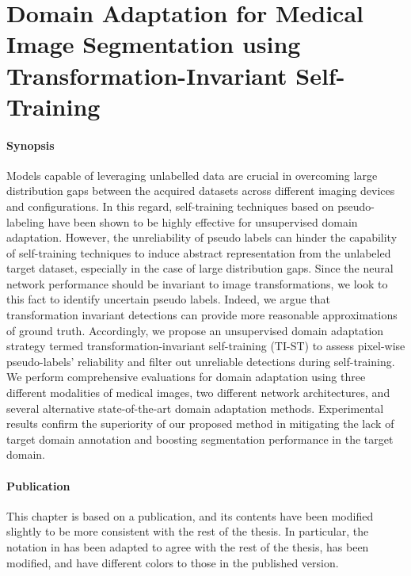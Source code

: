 \graphicspath{{ch5_tist/}{figures/}}

\chapter{Domain Adaptation for Medical Image Segmentation using Transformation-Invariant Self-Training}
\label{chapter:tist}


\subsubsection{Synopsis}Models capable of leveraging unlabelled data are crucial in overcoming large distribution gaps between the acquired datasets across different imaging devices and configurations. In this regard, self-training techniques based on pseudo-labeling have been shown to be highly effective for unsupervised domain adaptation. However, the unreliability of pseudo labels can hinder the capability of self-training techniques to induce abstract representation from the unlabeled target dataset, especially in the case of large distribution gaps. 
Since the neural network performance should be invariant to image transformations, we look to this fact to identify uncertain pseudo labels. Indeed, we argue that transformation invariant detections can provide more reasonable approximations of ground truth. Accordingly, we propose an unsupervised domain adaptation strategy termed transformation-invariant self-training (TI-ST) to assess pixel-wise pseudo-labels' reliability and filter out unreliable detections during self-training. We perform comprehensive evaluations for domain adaptation using three different modalities of medical images, two different network architectures, and several alternative state-of-the-art domain adaptation methods. Experimental results confirm the superiority of our proposed method in mitigating the lack of target domain annotation and boosting segmentation performance in the target domain.

\subsubsection{Publication}This chapter is based on a publication, and its contents have been modified slightly to be more consistent with the rest of the thesis. In particular, the notation in  has been adapted to agree with the rest of the thesis,  has been modified, and  have different colors to those in the published version.

